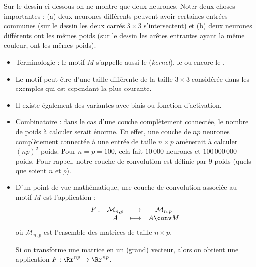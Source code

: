 \documentclass[11pt,class=report,crop=false]{standalone}
\begin{document}
Sur le dessin ci-dessous on ne montre que deux neurones.
Noter deux choses importantes : (a) deux neurones différents peuvent avoir certaines entrées communes (sur le dessin les deux carrés $3\times 3$ s'intersectent) et (b) deux neurones différents ont les mêmes poids (sur le dessin les arêtes entrantes ayant la même couleur, ont les mêmes poids).


   

\begin{remarque*}
\sauteligne
\begin{itemize}
  \item Terminologie : le motif $M$ s'appelle aussi le  (\emph{kernel}), le  ou encore le .
  
  \item Le motif peut être d'une taille différente de la taille $3\times 3$ considérée dans les exemples qui est cependant la plus courante.
  
  \item Il existe également des variantes avec biais ou fonction d'activation.
  
  \item Combinatoire : dans le cas d'une couche complètement connectée, le nombre de poids à calculer serait énorme. En effet, une couche de $np$ neurones complètement connectée à une entrée de taille $n\times p$ amènerait à calculer $(np)^2$ poids.
  Pour $n=p=100$, cela fait $10\,000$ neurones et $100 \, 000\,000$ poids. Pour rappel, notre couche de convolution est définie par $9$ poids (quels que soient $n$ et $p$).
  
  \item D'un point de vue mathématique, une couche de convolution associée au motif $M$ est l'application :
  $$\begin{array}{cccc}
  F : & \mathcal{M}_{n,p} & \longrightarrow & \mathcal{M}_{n,p} \\
      & A & \longmapsto & A \conv M
  \end{array}$$
  où $\mathcal{M}_{n,p}$ est l'ensemble des matrices de taille $n \times p$.
  
  Si on transforme une matrice en un (grand) vecteur, alors on obtient une application
  $F : \Rr^{np} \to \Rr^{np}$.
  
\end{itemize}
\end{remarque*}


\end{document}
